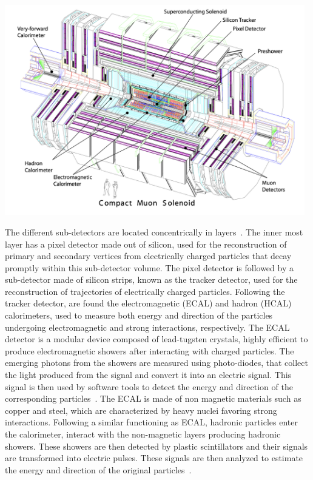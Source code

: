 \begin{center}
	\includegraphics[width=0.98\textwidth]{Images/CMS.png}
	\label{fig_cms}
\end{center}

The different sub-detectors are located concentrically in layers~\parencite{Collaboration_2008}. The inner most layer has a pixel detector made out of silicon, used for the reconstruction of primary and secondary vertices from electrically charged particles that decay promptly within this sub-detector volume. The pixel detector is followed by a sub-detector made of silicon strips, known as the tracker detector, used for the reconstruction of trajectories of electrically charged particles. Following the tracker detector, are found the electromagnetic (ECAL) and hadron (HCAL) calorimeters, used to measure both energy and direction of the particles undergoing electromagnetic and strong interactions, respectively. The ECAL detector is a modular device composed of lead-tugsten crystals, highly efficient to produce electromagnetic showers after interacting with charged particles. The emerging photons from the showers are measured using photo-diodes, that collect the light produced from the signal and convert it into an electric signal. This signal is then used by software tools to detect the energy and direction of the corresponding particles~\parencite{Collaboration_2008}. The ECAL is made of non magnetic materials such as copper and steel, which are characterized by heavy nuclei favoring strong interactions. Following a similar functioning as ECAL, hadronic particles enter the calorimeter, interact with the non-magnetic layers producing hadronic showers. These showers are then detected by plastic scintillators and their signals are transformed into electric pulses. These signals are then analyzed to estimate the energy and direction of the original particles~\parencite{Collaboration_2008}.

